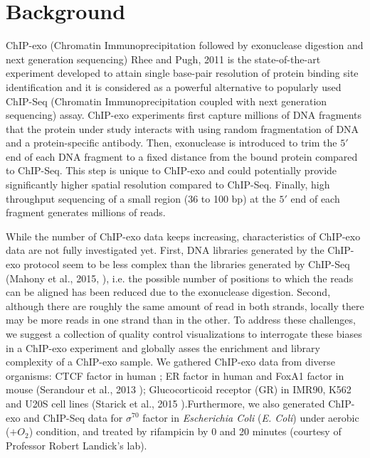 \documentclass{bmcart}\usepackage[]{graphicx}\usepackage[]{color}
\newcommand{\sig}{\sigma^{70}}
\begin{document}
\newpage

\section{Background}
\label{sec:intro}

ChIP-exo (Chromatin Immunoprecipitation followed by exonuclease
digestion and next generation sequencing) Rhee and Pugh, 2011
\cite{exo1} is the state-of-the-art experiment developed to attain
single base-pair resolution of protein binding site identification and
it is considered as a powerful alternative to popularly used ChIP-Seq
(Chromatin Immunoprecipitation coupled with next generation
sequencing) assay. ChIP-exo experiments first capture millions of DNA
fragments that the protein under study interacts with using random
fragmentation of DNA and a protein-specific antibody. Then,
exonuclease is introduced to trim the $5\prime$ end of each DNA
fragment to a fixed distance from the bound protein compared to
ChIP-Seq. This step is unique to ChIP-exo and could potentially
provide significantly higher spatial resolution compared to
ChIP-Seq. Finally, high throughput sequencing of a small region (36 to
100 bp) at the $5\prime$ end of each fragment generates millions of
reads.

While the number of ChIP-exo data keeps increasing, characteristics of
ChIP-exo data are not fully investigated yet. First, DNA libraries
generated by the ChIP-exo protocol seem to be less complex than the
libraries generated by ChIP-Seq (Mahony et al., 2015,
\cite{exo_review}), i.e. the possible number of positions to which the
reads can be aligned has been reduced due to the exonuclease
digestion. Second, although there are roughly the same amount of read
in both strands, locally there may be more reads in one strand than in
the other. To address these challenges, we suggest a collection of
quality control visualizations to interrogate these biases in a
ChIP-exo experiment and globally asses the enrichment and library
complexity of a ChIP-exo sample. We gathered ChIP-exo data from
diverse organisms: CTCF factor in human \cite{exo1}; ER factor in
human and FoxA1 factor in mouse (Serandour et al., 2013
\cite{exoillumina}); Glucocorticoid receptor (GR) in IMR90, K562 and
U20S cell lines (Starick et al., 2015 \cite{starick15}).Furthermore,
we also generated ChIP-exo and ChIP-Seq data for $\sig$ factor in
\emph{Escherichia Coli} (\emph{E. Coli}) under aerobic ($ + O_2$)
condition, and treated by rifampicin by 0 and 20 minutes (courtesy of
Professor Robert Landick's lab).
\end{document}
